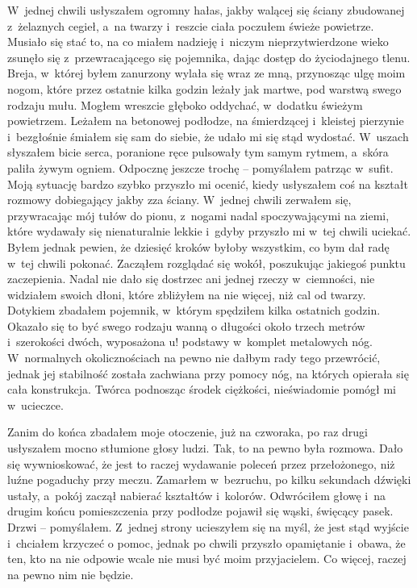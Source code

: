 W~jednej chwili usłyszałem ogromny hałas, jakby walącej się ściany zbudowanej z~żelaznych cegieł, a~na twarzy i~reszcie ciała poczułem świeże powietrze. Musiało się stać to, na co miałem nadzieję i~niczym nieprzytwierdzone wieko zsunęło się z~przewracającego się pojemnika, dając dostęp do życiodajnego tlenu. Breja, w~której byłem zanurzony wylała się wraz ze mną, przynosząc ulgę moim nogom, które przez ostatnie kilka godzin leżały jak martwe, pod warstwą swego rodzaju mułu. Mogłem wreszcie głęboko oddychać, w~dodatku świeżym powietrzem. Leżałem na betonowej podłodze, na śmierdzącej i~kleistej pierzynie i~bezgłośnie śmiałem się sam do siebie, że udało mi się stąd wydostać. W~uszach słyszałem bicie serca, poranione ręce pulsowały tym samym rytmem, a~skóra paliła żywym ogniem. Odpocznę jeszcze trochę -- pomyślałem patrząc w~sufit. Moją sytuację bardzo szybko przyszło mi ocenić, kiedy usłyszałem coś na kształt rozmowy dobiegający jakby zza ściany. W~jednej chwili zerwałem się, przywracając mój tułów do pionu, z~nogami nadal spoczywającymi na ziemi, które wydawały się nienaturalnie lekkie i~gdyby przyszło mi w~tej chwili uciekać. Byłem jednak pewien, że dziesięć kroków byłoby wszystkim, co bym dał radę w~tej chwili pokonać. Zacząłem rozglądać się wokół, poszukując jakiegoś punktu zaczepienia. Nadal nie dało się dostrzec ani jednej rzeczy w~ciemności, nie widziałem swoich dłoni, które zbliżyłem na nie więcej, niż cal od twarzy. Dotykiem zbadałem pojemnik, w~którym spędziłem kilka ostatnich godzin. Okazało się to być swego rodzaju wanną o długości około trzech metrów i~szerokości dwóch, wyposażona u! podstawy w~komplet metalowych nóg. W~normalnych okolicznościach na pewno nie dałbym rady tego przewrócić, jednak jej stabilność została zachwiana przy pomocy nóg, na których opierała się cała konstrukcja. Twórca podnosząc środek ciężkości, nieświadomie pomógł mi w~ucieczce. 

Zanim do końca zbadałem moje otoczenie, już na czworaka, po raz drugi usłyszałem mocno stłumione głosy ludzi. Tak, to na pewno była rozmowa. Dało się wywnioskować, że jest to raczej wydawanie poleceń przez przełożonego, niż luźne pogaduchy przy meczu. Zamarłem w~bezruchu, po kilku sekundach dźwięki ustały, a~pokój zaczął nabierać kształtów i~kolorów. Odwróciłem głowę i~na drugim końcu pomieszczenia przy podłodze pojawił się wąski, święcący pasek. Drzwi -- pomyślałem. Z~jednej strony ucieszyłem się na myśl, że jest stąd wyjście i~chciałem krzyczeć o pomoc, jednak po chwili przyszło opamiętanie i~obawa, że ten, kto na nie odpowie wcale nie musi być moim przyjacielem. Co więcej, raczej na pewno nim nie będzie. 

